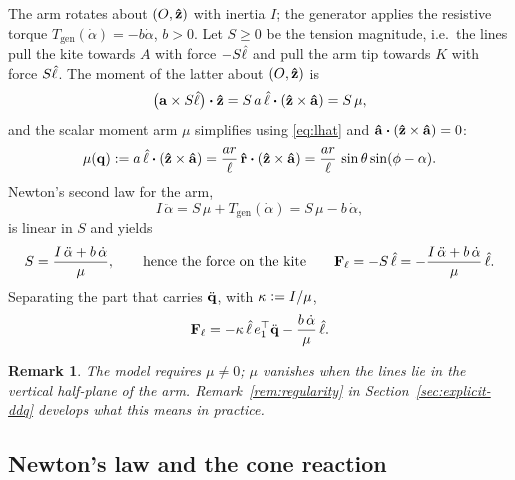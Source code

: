 \documentclass[10pt, a4paper]{article}
\newtheorem{remark}{Remark}
\begin{document}
The arm rotates about $(O, \vu z)$ with inertia $I$; the generator applies
the resistive torque $T_{\mathrm{gen}}(\dot\alpha) = -b\dot\alpha$, $b > 0$.
Let $S \ge 0$ be the tension magnitude, i.e.\ the lines pull the kite
towards $A$ with force $-S\hat \ell$ and pull the arm tip towards $K$ with force
$S\hat \ell$.  The moment of the latter about $(O, \vu z)$ is
\begin{equation}
    \bigl( \vb a \times S\lhat \bigr) \vdot \vu z
    = S\,a\,\lhat \vdot (\vu z \times \ahat)
    = S\,\mu,
\end{equation}
and the scalar moment arm $\mu$ simplifies using \eqref{eq:lhat} and
$\ahat \vdot (\vu z \times \ahat) = 0$:
\begin{equation} \label{eq:mu}
    \mu(\vq)
    := a\,\lhat \vdot (\vu z \times \ahat)
    = \frac{a r}{\ell}\, \rhat \vdot (\vu z \times \ahat)
    = \frac{a r}{\ell}\, \sin\theta \sin(\phi - \alpha).
\end{equation}
Newton's second law for the arm,
\begin{equation} \label{eq:arm-balance}
    I\,\ddot\alpha = S\,\mu + T_{\mathrm{gen}}(\dot\alpha)
    = S\,\mu - b\,\dot\alpha,
\end{equation}
is linear in $S$ and yields
\begin{equation} \label{eq:tension-magnitude}
    S = \frac{I\,\ddot\alpha + b\,\dot\alpha}{\mu},
    \qquad\text{hence the force on the kite}\qquad
    \vb F_\ell = -S\,\hat \ell
    = -\frac{I\,\ddot\alpha + b\,\dot\alpha}{\mu}\,\hat \ell.
\end{equation}
Separating the part that carries $\ddot{\vb q}$, with $\kappa \vcentcolon= I/\mu$,
\begin{equation} \label{eq:f-lines}
    \vb F_\ell
    = -\kappa\,\hat \ell\, e_1^\top \ddot{\vb q}
    - \frac{b\,\dot\alpha}{\mu}\,\hat \ell.
\end{equation}
\begin{remark}
    The model requires $\mu \ne 0$; $\mu$ vanishes when the lines lie in
    the vertical half-plane of the arm.  Remark~\ref{rem:regularity} in
    Section~\ref{sec:explicit-ddq} develops what this means in practice.
\end{remark}

\subsection{Newton's law and the cone reaction}
\end{document}
